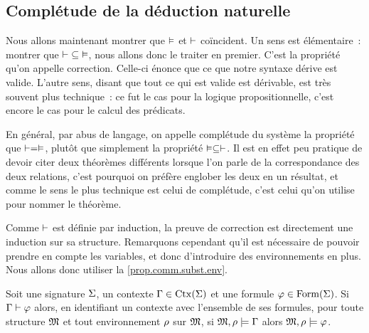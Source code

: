 \subsection[Théorème de complétude]{Complétude de la déduction naturelle}

Nous allons maintenant montrer que $\vDash$ et $\vdash$ coïncident. Un sens est
élémentaire~: montrer que $\mathord{\vdash} \subseteq\mathord{\vDash}$,
nous allons donc le traiter
en premier. C'est la propriété qu'on appelle correction. Celle-ci énonce que ce
que notre syntaxe dérive est valide. L'autre sens, disant que tout ce qui est
valide est dérivable, est très souvent plus technique~: ce fut le cas pour
la logique propositionnelle, c'est encore le cas pour le calcul des prédicats.

En général, par abus de langage, on appelle complétude du système la propriété
que $\vdash = \vDash$, plutôt que simplement la propriété
$\vDash\subseteq\vdash$. Il est en effet peu pratique de devoir citer deux
théorèmes différents lorsque l'on parle de la correspondance des deux relations,
c'est pourquoi on préfère englober les deux en un résultat, et comme le sens le
plus technique est celui de complétude, c'est celui qu'on utilise pour nommer le
théorème.

Comme $\vdash$ est définie par induction, la preuve de correction est
directement une induction sur sa structure. Remarquons cependant qu'il est
nécessaire de pouvoir prendre en compte les variables, et donc d'introduire des
environnements en plus. Nous allons donc utiliser la \cref{prop.comm.subst.env}.

\begin{theorem}[Correction]\label{thm.correction}
  Soit une signature $\Sigma$, un contexte $\Gamma\in\operatorname{Ctx}(\Sigma)$ et
  une formule $\varphi\in\operatorname{Form}(\Sigma)$. Si $\Gamma\vdash\varphi$ alors,
  en identifiant un contexte avec l'ensemble de ses formules,
  pour toute structure $\mathfrak{M}$ et tout environnement $\rho$ sur $\mathfrak{M}$, si
  $\mathfrak{M},\rho\models \Gamma$ alors $\mathfrak{M},\rho\models \varphi$.
\end{theorem}

